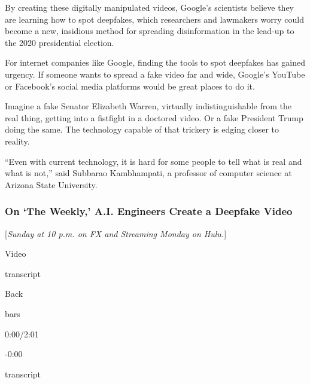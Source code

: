 By creating these digitally manipulated videos, Google's scientists
believe they are learning how to spot deepfakes, which researchers and
lawmakers worry could become a new, insidious method for spreading
disinformation in the lead-up to the 2020 presidential election.

For internet companies like Google, finding the tools to spot deepfakes
has gained urgency. If someone wants to spread a fake video far and
wide, Google's YouTube or Facebook's social media platforms would be
great places to do it.

Imagine a fake Senator Elizabeth Warren, virtually indistinguishable
from the real thing, getting into a fistfight in a doctored video. Or a
fake President Trump doing the same. The technology capable of that
trickery is edging closer to reality.

``Even with current technology, it is hard for some people to tell what
is real and what is not,'' said Subbarao Kambhampati, a professor of
computer science at Arizona State University.

\hypertarget{on-the-weekly-ai-engineers-create-a-deepfake-video}{%
\subsubsection{On `The Weekly,' A.I. Engineers Create a Deepfake
Video}\label{on-the-weekly-ai-engineers-create-a-deepfake-video}}

{[}\emph{Sunday at 10 p.m. on FX and Streaming Monday on Hulu.}{]}

Video

transcript

Back

bars

0:00/2:01

-0:00

transcript

